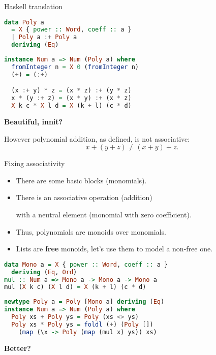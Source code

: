 \documentclass[handout]{beamer}
\begin{document}
\begin{frame}[fragile]{Haskell translation}

\begin{lstlisting}[language=Haskell]
data Poly a
  = X { power :: Word, coeff :: a }
  | Poly a :+ Poly a
  deriving (Eq)
\end{lstlisting}

\pause

\begin{lstlisting}[language=Haskell]
instance Num a => Num (Poly a) where
  fromInteger n = X 0 (fromInteger n)
  (+) = (:+)

  (x :+ y) * z = (x * z) :+ (y * z)
  x * (y :+ z) = (x * y) :+ (x * z)
  X k c * X l d = X (k + l) (c * d)
\end{lstlisting}

\medskip

\centerline{\bf Beautiful, innit?}

\bigskip

\pause

However polynomial addition, as defined, is not associative:
$$ x + (y + z) \ne (x + y) + z. $$

\end{frame}

\begin{frame}[fragile]{Fixing associativity}

\begin{itemize}[<+->]
\item There are some basic blocks (monomials).
\item There is an associative operation (addition) \par
      with a neutral element (monomial with zero coefficient).
\item Thus, polynomials are monoids over monomials.
\item Lists are {\bf free} monoids,
      let's use them to  model a non-free one.
\end{itemize}

\pause

\begin{lstlisting}[language=Haskell]
data Mono a = X { power :: Word, coeff :: a }
  deriving (Eq, Ord)
mul :: Num a => Mono a -> Mono a -> Mono a
mul (X k c) (X l d) = X (k + l) (c * d)
\end{lstlisting}

\pause

\begin{lstlisting}[language=Haskell]
newtype Poly a = Poly [Mono a] deriving (Eq)
instance Num a => Num (Poly a) where
  Poly xs + Poly ys = Poly (xs <> ys)
  Poly xs * Poly ys = foldl (+) (Poly [])
    (map (\x -> Poly (map (mul x) ys)) xs)
\end{lstlisting}

\medskip

\centerline{\bf Better?}
\end{frame}
\end{document}
